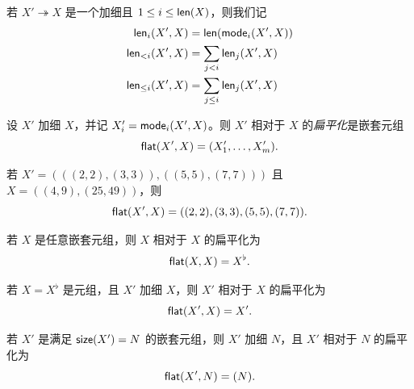 \begin{notation}
    若 $X' \twoheadrightarrow X$ 是一个加细且 $1 \leq i \leq \mathsf{len}(X)$，则我们记
    \begin{align*}
    \mathsf{len}_i(X',X) & = \mathsf{len}(\mathsf{mode}_i(X',X))\\
    \mathsf{len}_{<i}(X',X) & = \sum_{j < i} \mathsf{len}_j(X',X)\\
    \mathsf{len}_{\leq i}(X',X) & = \sum_{j \leq i} \mathsf{len}_j(X',X)
    \end{align*}
\end{notation}








\begin{definition}
    设 $X'$ 加细 $X$，并记 $X_i' = \mathsf{mode}_i(X',X)$。则 $X'$ 相对于 $X$ 的{\it 扁平化}是嵌套元组
    \[
    \mathsf{flat}(X',X) = (X_1',\dots,X_m').
    \]
\end{definition}

\begin{example} 
若 $X' = (((2,2),(3,3)),((5,5),(7,7)))$ 且 $X = ((4,9),(25,49))$，则
\[
\mathsf{flat}(X',X) = ((2,2),(3,3),(5,5),(7,7)).
\]
\end{example}

\begin{example}
    若 $X$ 是任意嵌套元组，则 $X$ 相对于 $X$ 的扁平化为
    \[
    \mathsf{flat}(X,X) = X^\flat.
    \]
\end{example}

\begin{example}
    若 $X = X^\flat$ 是元组，且 $X'$ 加细 $X$，则 $X'$ 相对于 $X$ 的扁平化为
    \[
    \mathsf{flat}(X',X) = X'. 
    \]
\end{example}

\begin{example}
    若 $X'$ 是满足 $\mathsf{size}(X') = N$ 的嵌套元组，则 $X'$ 加细 $N$，且 $X'$ 相对于 $N$ 的扁平化为
    \[
    \mathsf{flat}(X',N) = (N). 
    \]
\end{example}

